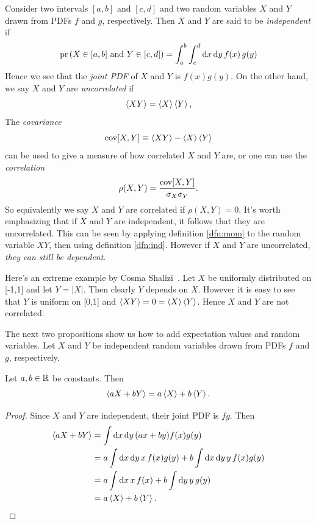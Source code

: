 Consider two intervals $[a,b]$ and $[c,d]$ and two random variables
$X$ and $Y$ drawn from PDFs $f$ and $g$, respectively. Then $X$ and $Y$ are
said to be {\it independent} if
\begin{equation}\label{dfn:ind}
  \operatorname{pr}\left(X\in[a,b]\text{ and }Y\in[c,d]\right)=\int_a^b\int_c^d\dd{x}\dd{y}f(x)\,g(y)
\end{equation}
Hence we see that the {\it joint PDF} of $X$ and $Y$ 
is $f(x)g(y)$. On the other hand, we say $X$ and $Y$ are {\it uncorrelated} 
 if
\begin{equation}
  \ev{XY}=\ev{X}\ev{Y},
\end{equation}
The {\it covariance}
\begin{equation}\label{dfn:cov}
  \Cov[X,Y]\equiv\ev{XY}-\ev{X}\ev{Y}
\end{equation}
can be used to give a measure of how correlated $X$ and $Y$ are, or
one can use the {\it correlation}
\begin{equation}\label{dfn:cor}
  \rho(X,Y)=\frac{\operatorname{cov}[X,Y]}{\sigma_X\sigma_Y}.
\end{equation}
So equivalently we say $X$ and $Y$ are correlated if $\rho(X,Y)=0$.
It's worth emphasizing that if $X$ and $Y$ are independent,
it follows that they are uncorrelated. This can be seen by applying
definition \eqref{dfn:mom} to the random variable $XY$, then using
definition \eqref{dfn:ind}. However if $X$ and $Y$ are
uncorrelated, {\it they can still be dependent}.
\begin{example*}{}{}
  Here's an extreme example by Cosma Shalizi~\cite{cosma_indep}. 
Let $X$ be uniformly distributed
  on [-1,1] and let $Y=|X|$. Then clearly $Y$ depends on $X$. However it 
  is easy to see that $Y$ is uniform on [0,1] and $\ev{XY}=0=\ev{X}\ev{Y}$. 
  Hence $X$ and $Y$ are not correlated.
\end{example*}

The next two propositions show us how to add expectation values and
random variables. Let $X$ and $Y$ be independent random variables 
drawn from PDFs $f$ and $g$, respectively.
\begin{proposition}{}{}
  Let $a,b\in\mathbb{R}$ be constants. Then
  $$\ev{aX+bY}=a\ev{X}+b\ev{Y}.$$
  \begin{proof}
    Since $X$ and $Y$ are independent, their joint PDF is $fg$. Then
    \begin{equation*}
      \begin{aligned}
      \ev{aX+bY}&=\int\dd{x}\dd{y}(ax+by)f(x)g(y)\\
                &=a\int\dd{x}\dd{y}x\,f(x)g(y)+
                 b\int\dd{x}\dd{y}y\,f(x)g(y)\\
                &=a\int\dd{x}x\,f(x)+b\int\dd{y}y\,g(y)\\
                &=a\ev{X}+b\ev{Y}.
      \end{aligned}
    \end{equation*}
  \end{proof}
\end{proposition}


